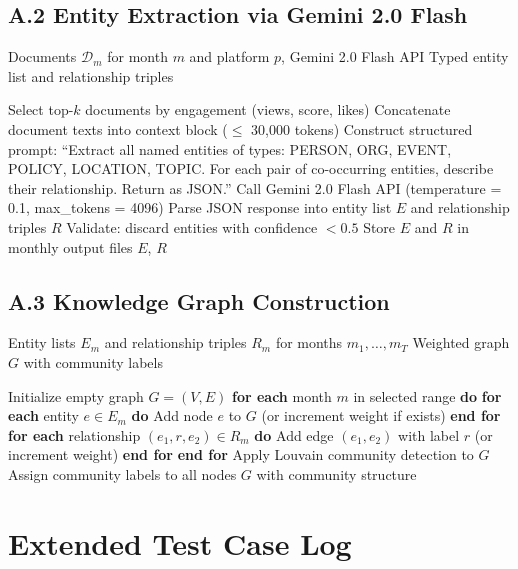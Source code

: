 \documentclass[12pt, letterpaper]{article}
\newenvironment{pseudoblock}[1]{%
  \begin{mdframed}[
    backgroundcolor=pseudobg,
    linecolor=pseudoframe,
    linewidth=1.5pt,
    frametitle={\color{pseudoframe}\bfseries\small Pseudo-code: #1},
    frametitlebackgroundcolor=pseudoframe!15
  ]
  \begin{algorithmic}[1]
}{%
  \end{algorithmic}
  \end{mdframed}
}
\begin{document}
\subsection*{A.2 \quad Entity Extraction via Gemini 2.0 Flash}

\begin{pseudoblock}{Entity Extraction Pipeline (see Section~\ref{sec:model})}
\REQUIRE Documents $\mathcal{D}_m$ for month $m$ and platform $p$, Gemini 2.0 Flash API
\ENSURE Typed entity list and relationship triples

\STATE Select top-$k$ documents by engagement (views, score, likes)
\STATE Concatenate document texts into context block ($\leq$ 30,000 tokens)
\STATE Construct structured prompt:
\STATE \quad ``Extract all named entities of types: PERSON, ORG, EVENT,
\STATE \quad POLICY, LOCATION, TOPIC. For each pair of co-occurring entities,
\STATE \quad describe their relationship. Return as JSON.''
\STATE Call Gemini 2.0 Flash API (temperature = 0.1, max\_tokens = 4096)
\STATE Parse JSON response into entity list $E$ and relationship triples $R$
\STATE Validate: discard entities with confidence $< 0.5$
\STATE Store $E$ and $R$ in monthly output files
\RETURN $E$, $R$
\end{pseudoblock}

\subsection*{A.3 \quad Knowledge Graph Construction}

\begin{pseudoblock}{Knowledge Graph with Louvain Community Detection}
\REQUIRE Entity lists $E_{m}$ and relationship triples $R_{m}$ for months $m_1, \ldots, m_T$
\ENSURE Weighted graph $G$ with community labels

\STATE Initialize empty graph $G = (V, E)$
\STATE \textbf{for each} month $m$ in selected range \textbf{do}
\STATE \quad \textbf{for each} entity $e \in E_m$ \textbf{do}
\STATE \quad \quad Add node $e$ to $G$ (or increment weight if exists)
\STATE \quad \textbf{end for}
\STATE \quad \textbf{for each} relationship $(e_1, r, e_2) \in R_m$ \textbf{do}
\STATE \quad \quad Add edge $(e_1, e_2)$ with label $r$ (or increment weight)
\STATE \quad \textbf{end for}
\STATE \textbf{end for}
\STATE Apply Louvain community detection to $G$
\STATE Assign community labels to all nodes
\RETURN $G$ with community structure
\end{pseudoblock}

\section{Extended Test Case Log}
\label{app:testcases}
\end{document}
